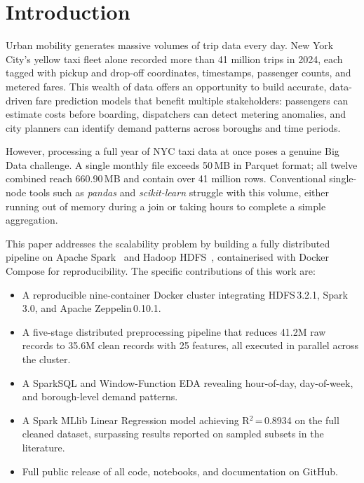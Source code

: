 \documentclass[conference]{IEEEtran}
\begin{document}
\section{Introduction}

Urban mobility generates massive volumes of trip data every day.
New York City's yellow taxi fleet alone recorded more than 41
million trips in 2024, each tagged with pickup and drop-off
coordinates, timestamps, passenger counts, and metered fares. This
wealth of data offers an opportunity to build accurate, data-driven
fare prediction models that benefit multiple stakeholders: passengers
can estimate costs before boarding, dispatchers can detect metering
anomalies, and city planners can identify demand patterns across
boroughs and time periods.

However, processing a full year of NYC taxi data at once poses a
genuine Big Data challenge. A single monthly file exceeds 50\,MB in
Parquet format; all twelve combined reach 660.90\,MB and contain
over 41 million rows. Conventional single-node tools such as
\textit{pandas} and \textit{scikit-learn} struggle with this volume,
either running out of memory during a join or taking hours to
complete a simple aggregation.

This paper addresses the scalability problem by building a fully
distributed pipeline on Apache Spark~\cite{zaharia2016apache} and
Hadoop HDFS~\cite{white2015hadoop}, containerised with Docker
Compose for reproducibility. The specific contributions of this work
are:

\begin{itemize}
  \item A reproducible nine-container Docker cluster integrating
        HDFS\,3.2.1, Spark\,3.0, and Apache Zeppelin\,0.10.1.
  \item A five-stage distributed preprocessing pipeline that
        reduces 41.2M raw records to 35.6M clean records with 25
        features, all executed in parallel across the cluster.
  \item A SparkSQL and Window-Function EDA revealing hour-of-day,
        day-of-week, and borough-level demand patterns.
  \item A Spark MLlib Linear Regression model achieving
        R$^{2}$\,=\,0.8934 on the full cleaned dataset, surpassing
        results reported on sampled subsets in the literature.
  \item Full public release of all code, notebooks, and
        documentation on GitHub.
\end{itemize}
\end{document}
